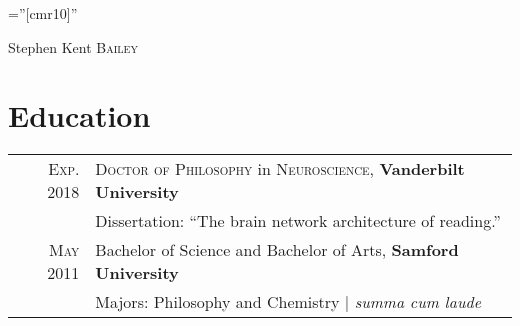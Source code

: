 \documentclass[a4paper,10pt]{article}
\begin{document}
\pagestyle{empty} %

\font\fb=''[cmr10]'' %

\par{\centering
		{\Huge Stephen Kent \textsc{Bailey}
	}\\ \medskip}


\section{Education}
\begin{tabular}{rp{11cm}}	

    \textsc{Exp.} 2018 & \textsc{Doctor of Philosophy} in \textsc{Neuroscience}, \textbf{Vanderbilt University}\\
    & Dissertation: ``The brain network architecture of reading.''  \smallskip \\
    
    \textsc{May} 2011 & Bachelor of Science and Bachelor of Arts, \textbf{Samford University}\\
    & Majors: Philosophy and Chemistry | \emph{summa cum laude} \\

\end{tabular}
\end{document}
